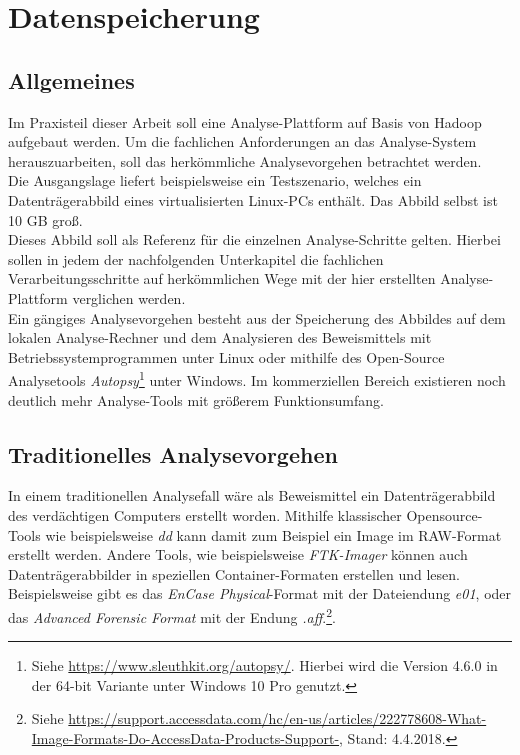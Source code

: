 \chapter{Datenspeicherung}
\label{ch:data_persistence}

\section{Allgemeines}
Im Praxisteil dieser Arbeit soll eine Analyse-Plattform auf Basis von Hadoop aufgebaut werden. Um die fachlichen Anforderungen an das Analyse-System herauszuarbeiten, soll das herkömmliche Analysevorgehen betrachtet werden.\\
Die Ausgangslage liefert beispielsweise ein Testszenario, welches ein Datenträgerabbild eines virtualisierten Linux-PCs enthält. Das Abbild selbst ist 10 GB groß.\\

\noindent
Dieses Abbild soll als Referenz für die einzelnen Analyse-Schritte gelten. 
Hierbei sollen in jedem der nachfolgenden Unterkapitel die fachlichen Verarbeitungsschritte auf herkömmlichen Wege mit der hier erstellten Analyse-Plattform verglichen werden.\\
Ein gängiges Analysevorgehen besteht aus der Speicherung des Abbildes auf dem lokalen Analyse-Rechner und dem Analysieren des Beweismittels mit Betriebssystemprogrammen unter Linux oder mithilfe des Open-Source Analysetools \textit{Autopsy}\footnote{Siehe \url{https://www.sleuthkit.org/autopsy/}. Hierbei wird die Version 4.6.0 in der 64-bit Variante unter Windows 10 Pro genutzt.} unter Windows. Im kommerziellen Bereich existieren noch deutlich mehr Analyse-Tools mit größerem Funktionsumfang. 

\section{Traditionelles Analysevorgehen}
In einem traditionellen Analysefall wäre als Beweismittel ein Datenträgerabbild des verdächtigen Computers erstellt worden. Mithilfe klassischer Opensource-Tools wie beispielsweise \textit{dd} kann damit zum Beispiel ein Image im RAW-Format erstellt werden. Andere Tools, wie beispielsweise \textit{FTK-Imager} können auch Datenträgerabbilder in speziellen Container-Formaten erstellen und lesen. Beispielsweise gibt es das \textit{EnCase Physical}-Format mit der Dateiendung \textit{e01}, oder das \textit{Advanced Forensic Format} mit der Endung \textit{.aff}.\footnote{Siehe \url{https://support.accessdata.com/hc/en-us/articles/222778608-What-Image-Formats-Do-AccessData-Products-Support-}, Stand: 4.4.2018.}.\\


